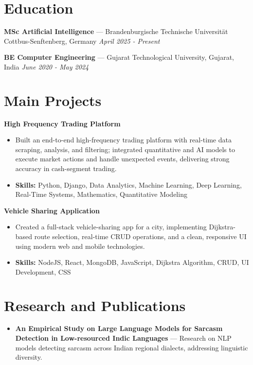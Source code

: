 \documentclass[a4paper,10pt]{article}
\begin{document}
\section*{Education}
\textbf{MSc Artificial Intelligence} — Brandenburgische Technische Universität Cottbus-Senftenberg, Germany \hfill \textit{April 2025 - Present}\par
\vspace{1.5pt}
\textbf{BE Computer Engineering} — Gujarat Technological University, Gujarat, India \hfill \textit{June 2020 - May 2024}\par

\section*{Main Projects}
\textbf{High Frequency Trading Platform}\par
\vspace{1pt}
\begin{itemize}
  \item Built an end-to-end high-frequency trading platform with real-time data scraping, analysis, and filtering; integrated quantitative and AI models to execute market actions and handle unexpected events, delivering strong accuracy in cash-segment trading.
  \item \textbf{Skills:} Python, Django, Data Analytics, Machine Learning, Deep Learning, Real-Time Systems, Mathematics, Quantitative Modeling
\end{itemize}
\vspace{3pt}
\textbf{Vehicle Sharing Application}\par
\vspace{1pt}
\begin{itemize}
  \item Created a full-stack vehicle-sharing app for a city, implementing Dijkstra-based route selection, real-time CRUD operations, and a clean, responsive UI using modern web and mobile technologies.
  \item \textbf{Skills:} NodeJS, React, MongoDB, JavaScript, Dijkstra Algorithm, CRUD, UI Development, CSS
\end{itemize}

\section*{Research and Publications}
\begin{itemize}
\item \textbf{An Empirical Study on Large Language Models for Sarcasm Detection in Low-resourced Indic Languages} — Research on NLP models detecting sarcasm across Indian regional dialects, addressing linguistic diversity.
\end{itemize}
\end{document}
